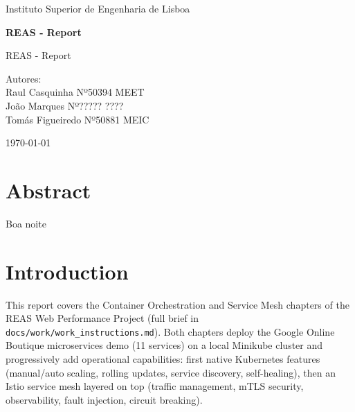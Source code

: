 \documentclass[a4paper,11pt]{article}
\newcommand{\titulodoc}{REAS - Report}
\newcommand{\nomeprojeto}{REAS - Report}
\newcommand{\autores}{Autores: \\ Raul Casquinha Nº50394 MEET \\ João Marques Nº????? ???? \\ Tomás Figueiredo Nº50881 MEIC}
\newcommand{\organizacao}{Instituto Superior de Engenharia de Lisboa}
\begin{document}
\begin{titlepage}
  \thispagestyle{empty}
  \centering

  \vspace*{1cm}

  {\large \organizacao \par}
  \vspace{3cm}

  {\Huge\bfseries \titulodoc \par}
  \vspace{0.8cm}
  {\LARGE \nomeprojeto \par}

  \vfill

  {\large \autores \par}
  \vspace{1cm}
  {\large \today \par}
  \vspace{1cm}
\end{titlepage}



\tableofcontents
\newpage




\section{Abstract}
Boa noite

\tableofcontents

\section{Introduction}

This report covers the Container Orchestration and Service Mesh chapters of the REAS Web
Performance Project (full brief in \texttt{docs/work/work\_instructions.md}). Both chapters deploy
the Google Online Boutique microservices demo (11 services) on a local Minikube cluster and
progressively add operational capabilities: first native Kubernetes features (manual/auto scaling,
rolling updates, service discovery, self-healing), then an Istio service mesh layered on top
(traffic management, mTLS security, observability, fault injection, circuit breaking).
\end{document}
